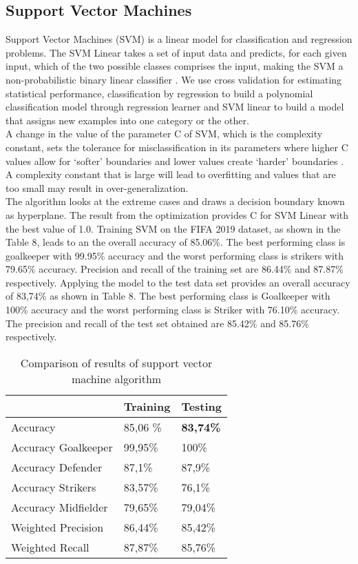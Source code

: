 \subsection{Support Vector Machines}
Support Vector Machines (SVM) is a linear model for classification and regression problems. The SVM Linear takes a set of input data and predicts, for each given input, which of the two possible classes comprises the input, making the SVM a non-probabilistic binary linear classifier \cite{ref_rapidminersvm}.
We use cross validation for estimating statistical performance, classification by regression to build a polynomial classification model through regression learner and SVM linear to build a model that assigns new examples into one category or the other.\\
 A change in the value of the parameter C of SVM, which is the complexity constant, sets the tolerance for misclassification in its parameters where higher C values allow for `softer' boundaries and lower values create `harder' boundaries \cite{ref_rapidminersvm}.  A complexity constant that is large will lead to overfitting and values that are too small may result in over-generalization.\\
The algorithm looks at the extreme cases and draws a decision boundary known as hyperplane. The result from the optimization provides C for SVM Linear with the best value of 1.0. 
Training SVM on the FIFA 2019 dataset, as shown in the Table 8, leads to an the overall accuracy of 85.06\%. The best performing class is goalkeeper with 99.95\% accuracy and the worst performing class is strikers with 79.65\% accuracy. Precision and recall of the training set are 86.44\% and 87.87\% respectively. 
Applying the model to the test data set provides an overall accuracy of 83,74\% as shown in Table 8. The best performing class is Goalkeeper with 100\% accuracy and the worst performing class is Striker with 76.10\% accuracy. The precision and recall of the test set obtained are 85.42\% and 85.76\% respectively. 

\begin{table}[]
\centering
\begin{tabular}{@{}l|ll@{}}
\toprule
                    & Training & Testing \\ \midrule
Accuracy            & 85,06 \% & \textbf{83,74\%} \\ \midrule
Accuracy Goalkeeper & 99,95\%  & 100\%   \\
Accuracy Defender   & 87,1\%   & 87,9\%  \\
Accuracy Strikers   & 83,57\%  & 76,1\%  \\
Accuracy Midfielder & 79,65\%  & 79,04\% \\ \midrule
Weighted Precision  & 86,44\%  & 85,42\% \\
Weighted Recall     & 87,87\%  & 85,76\% \\ \bottomrule
\end{tabular}
\label{Tab:SVM}
\caption{Comparison of results of support vector machine algorithm}
\end{table}
